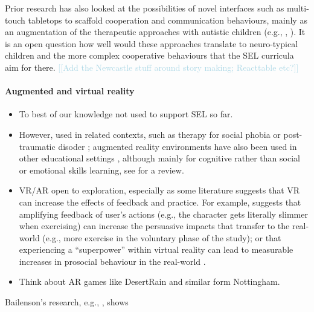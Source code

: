 \documentclass[prodmode,acmtochi]{acmsmall}
\newcommand{\todo}[1]{\textrm{\textrm{\textcolor{LightBlue}{[[#1]]} } } }
\begin{document}
Prior research has also looked at the possibilities of novel interfaces such as multi-touch tabletops to scaffold cooperation and communication behaviours, mainly as an augmentation of the therapeutic approaches with autistic children (e.g., \cite{Piper2006}, \cite{Zarin2011}). It is an open question how well would these approaches translate to neuro-typical children and the more complex cooperative behaviours that the SEL curricula aim for there.  
\todo{Add the Newcastle stuff around story making; Reacttable etc?}



\paragraph{Augmented and virtual reality}
\begin{itemize}
	\item To best of our knowledge not used to support SEL so far.
	\item However, used in related contexts, such as therapy for social phobia \cite{Romano2005} or post-traumatic disoder \cite{Rizzo2013}; augmented reality environments have also been used in other educational settings \cite{Ger-AmbientWoods}, although mainly for cognitive rather than social or emotional skills learning, see  for a review.
	\item VR/AR open to exploration, especially as some literature suggests that VR can increase the effects of feedback and practice. For example,  suggests that amplifying feedback of user's actions (e.g., the character gets literally slimmer when exercising) can increase the persuasive impacts that transfer to the real-world (e.g., more exercise in the voluntary phase of the study); or that experiencing a ``superpower'' within virtual reality can lead to measurable increases in prosocial behaviour in the real-world \cite{Rosenberg2013}. 
	\item Think about AR games like DesertRain and similar form Nottingham. 

\end{itemize}



\iffalse
                        \item Bailenson's research, e.g., \cite{Bailenson2005,Bailenson2008}, shows 
\end{document}
